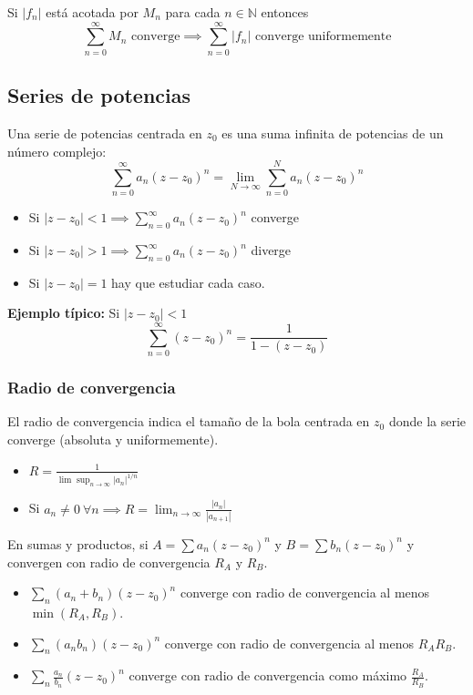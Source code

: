 \documentclass[paper=a4, fontsize=11pt]{scrartcl}
\numberwithin{equation}{section}
\numberwithin{figure}{section}
\numberwithin{table}{section}
\begin{document}
Si $|f_n|$ está acotada por $M_n$ para cada $n\in\mathbb{N}$ entonces
$$\sum_{n=0}^\infty M_n \text{ converge} \implies \sum_{n=0}^\infty |f_n| \text{ converge uniformemente}$$


\subsection{Series de potencias}
Una serie de potencias centrada en $z_0$ es una suma infinita de potencias de un número complejo:
$$\sum_{n=0}^\infty a_n(z-z_0)^n = \lim_{N\to\infty}\sum_{n=0}^N a_n(z-z_0)^n$$

\begin{itemize}
\item Si $|z-z_0|<1 \implies \sum_{n=0}^\infty a_n(z-z_0)^n$ converge
\item Si $|z-z_0|>1 \implies \sum_{n=0}^\infty a_n(z-z_0)^n$ diverge
\item Si $|z-z_0|=1$ hay que estudiar cada caso.
\end{itemize}

\textbf{Ejemplo típico:}
Si $|z-z_0|<1$
$$\boxed{\sum_{n=0}^\infty (z-z_0)^n = \frac{1}{1-(z-z_0)}}$$

\subsubsection{Radio de convergencia}
El radio de convergencia indica el tamaño de la bola centrada en $z_0$ donde la serie converge (absoluta y uniformemente).
\begin{itemize}
\item $\boxed{R = \frac{1}{\lim \sup_{n\to \infty} |a_n|^{1/n}}}$
\item Si $a_n\neq 0 \ \forall n \implies \boxed{R = \lim_{n\to\infty}\frac{|a_{n}|}{|a_{n+1}|}}$
\end{itemize}

En sumas y productos, si $A = \sum a_n(z-z_0)^n$ y $B = \sum b_n(z-z_0)^n$ y convergen con radio de convergencia $R_A$ y $R_B$.
\begin{itemize}
\item $\sum_n (a_n+b_n)(z-z_0)^n$ converge con radio de convergencia al menos $\min(R_A, R_B)$.
\item $\sum_n (a_nb_n)(z-z_0)^n$ converge con radio de convergencia al menos $R_AR_B$.
\item $\sum_n \frac{a_n}{b_n}(z-z_0)^n$ converge con radio de convergencia como máximo $\frac{R_A}{R_B}$.
\end{itemize}
\end{document}
